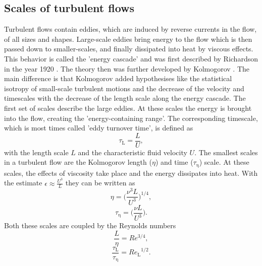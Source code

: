 \documentclass[11pt,a4paper,openany,oneside,parskip=half*]{article}
\begin{document}
\subsection{Scales of turbulent flows}
Turbulent flows contain eddies, which are induced by reverse currents in the flow, of all sizes and shapes. Large-scale eddies bring energy to the flow which is then passed down to smaller-scales, and finally dissipated into heat by viscous effects. This behavior is called the 'energy cascade' and was first described by Richardson in the year 1920 \cite{Richardson1920}. The theory then was further developed by Kolmogorov \cite{Kolmogorov1941}. The main difference is that Kolmogorov added hypothesises like the statistical isotropy of small-scale turbulent motions and the decrease of the velocity and timescales with the decrease of the length scale along the energy cascade.
\newline
The first set of scales describe the large eddies. At these scales the energy is brought into the flow, creating the 'energy-containing range'. The corresponding timescale, which is most times called 'eddy turnover time', is defined as
\begin{equation}
\tau_\mathrm{L} = \frac{L}{U},
\end{equation}
with the length scale $L$ and the characteristic fluid velocity $U$.
\newline
The smallest scales in a turbulent flow are the Kolmogorov length ($\eta$) and time ($\tau_\mathrm{\eta}$) scale. At these scales, the effects of viscosity take place and the energy dissipates into heat. With the estimate $\epsilon \approx \frac{U^3}{L} $ they can be written as
\begin{equation}
\eta = \biggl (\frac{\nu^3 L}{U^3} \biggl )^{1/4},
\end{equation}
\begin{equation}
\tau_\mathrm{\eta} = \biggl (\frac{\nu L}{U^3} \biggl ).
\end{equation}
Both these scales are coupled by the Reynolds numbers
\begin{equation}
\frac{L}{\eta} = Re^{3/4},
\end{equation}
\begin{equation}
\frac{\tau_\mathrm{L}}{\tau_\mathrm{\eta}} = {Re_\mathrm{L}}^{1/2}.
\end{equation}
\end{document}
